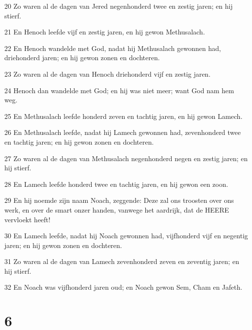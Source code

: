 \par 20 Zo waren al de dagen van Jered negenhonderd twee en zestig jaren; en hij stierf.
\par 21 En Henoch leefde vijf en zestig jaren, en hij gewon Methusalach.
\par 22 En Henoch wandelde met God, nadat hij Methusalach gewonnen had, driehonderd jaren; en hij gewon zonen en dochteren.
\par 23 Zo waren al de dagen van Henoch driehonderd vijf en zestig jaren.
\par 24 Henoch dan wandelde met God; en hij was niet meer; want God nam hem weg.
\par 25 En Methusalach leefde honderd zeven en tachtig jaren, en hij gewon Lamech.
\par 26 En Methusalach leefde, nadat hij Lamech gewonnen had, zevenhonderd twee en tachtig jaren; en hij gewon zonen en dochteren.
\par 27 Zo waren al de dagen van Methusalach negenhonderd negen en zestig jaren; en hij stierf.
\par 28 En Lamech leefde honderd twee en tachtig jaren, en hij gewon een zoon.
\par 29 En hij noemde zijn naam Noach, zeggende: Deze zal ons troosten over ons werk, en over de smart onzer handen, vanwege het aardrijk, dat de HEERE vervloekt heeft!
\par 30 En Lamech leefde, nadat hij Noach gewonnen had, vijfhonderd vijf en negentig jaren; en hij gewon zonen en dochteren.
\par 31 Zo waren al de dagen van Lamech zevenhonderd zeven en zeventig jaren; en hij stierf.
\par 32 En Noach was vijfhonderd jaren oud; en Noach gewon Sem, Cham en Jafeth.

\chapter{6}

